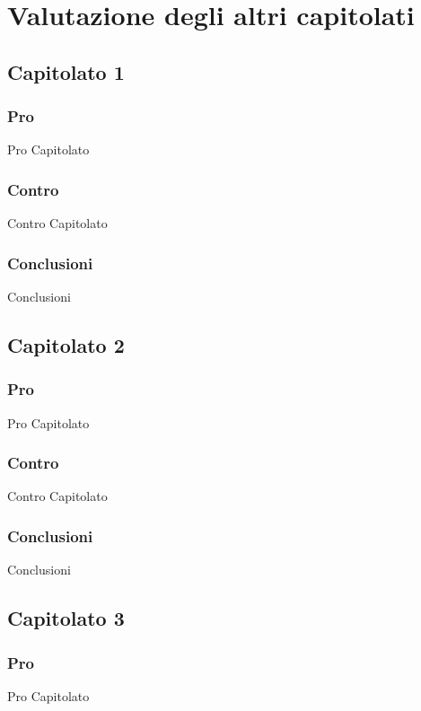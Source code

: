\section{Valutazione degli altri capitolati}

\subsection{Capitolato 1}

\subsubsection{Pro}
Pro Capitolato

\subsubsection{Contro}
Contro Capitolato

\subsubsection{Conclusioni}
Conclusioni

\subsection{Capitolato 2}

\subsubsection{Pro}
Pro Capitolato

\subsubsection{Contro}
Contro Capitolato

\subsubsection{Conclusioni}
Conclusioni

\subsection{Capitolato 3}

\subsubsection{Pro}
Pro Capitolato

